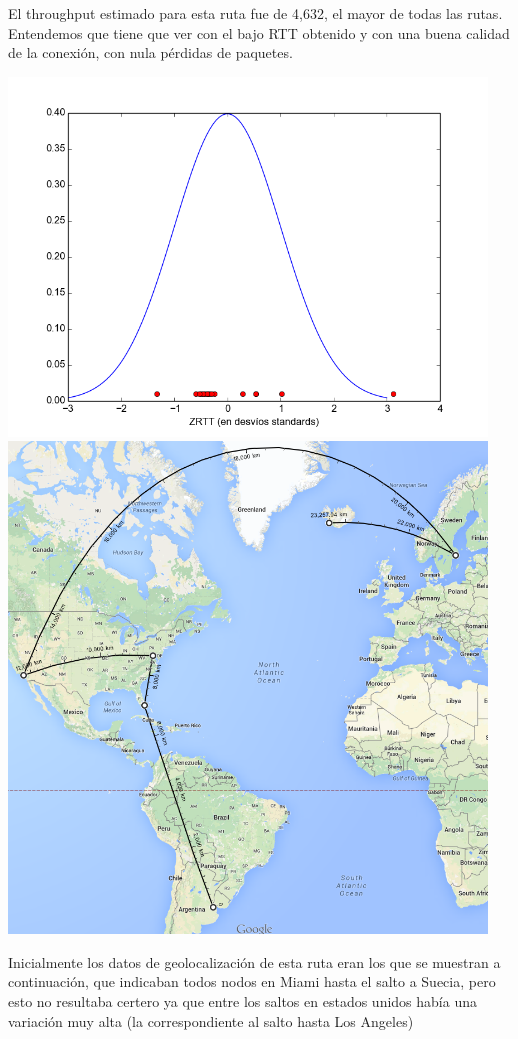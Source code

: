  El throughput estimado para esta ruta fue de 4,632, el mayor de todas las rutas. Entendemos que tiene que ver con el bajo RTT obtenido y con una buena calidad de la conexión, con nula pérdidas de paquetes.

 \includegraphics[width=5in]{imgs/iceland_dist.png}
 \includegraphics[width=5in]{imgs/maps/iceland2.png}


 Inicialmente los datos de geolocalización de esta ruta eran los que se muestran a continuación, que indicaban todos nodos en Miami hasta el salto a Suecia, pero esto no resultaba certero ya que entre los saltos en estados unidos había una variación muy alta (la correspondiente al salto hasta Los Angeles)

